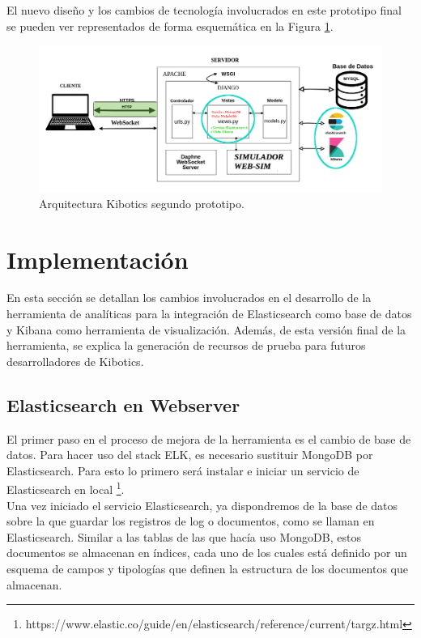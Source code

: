 \documentclass[a4paper, 12pt]{book}
\begin{document}
		El nuevo diseño y los cambios de tecnología involucrados en este prototipo final se pueden ver representados de forma esquemática en la Figura \ref{fig:arquitectura_kibotics_2}. 
		
		\begin{figure}[H]
			\centering
			\includegraphics[width=16cm, keepaspectratio]{img/esquema_Kibotics_2.png}
			\caption{Arquitectura Kibotics segundo prototipo.}
			\label{fig:arquitectura_kibotics_2}
		\end{figure}
	
	\section{Implementación} 
	\label{sec:2_implementacion} 
	
		En esta sección se detallan los cambios involucrados en el desarrollo de la herramienta de analíticas para la integración de Elasticsearch como base de datos y Kibana como herramienta de visualización. Además, de esta versión final de la herramienta, se explica la generación de recursos de prueba para futuros desarrolladores de Kibotics.
	\subsection{Elasticsearch en Webserver}
	\label{subsec:elasticsearch_kibotics}
	
		El primer paso en el proceso de mejora de la herramienta es el cambio de base de datos. Para hacer uso del stack ELK, es necesario sustituir MongoDB por Elasticsearch. Para esto lo primero será instalar e iniciar un servicio de Elasticsearch en local \footnote{https://www.elastic.co/guide/en/elasticsearch/reference/current/targz.html}.\\
				
		Una vez iniciado el servicio Elasticsearch, ya dispondremos de la base de datos sobre la que guardar los registros de log o documentos, como se llaman en Elasticsearch. Similar a las tablas de las que hacía uso MongoDB, estos documentos se almacenan en índices, cada uno de los cuales está definido por un esquema de campos y tipologías que definen la estructura de los documentos que almacenan.\\
		
\end{document}
